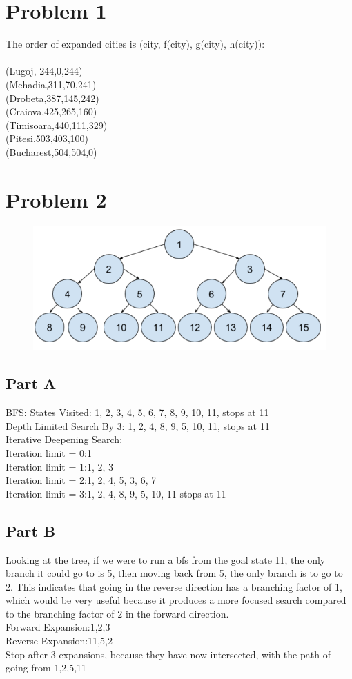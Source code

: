 \documentclass[12pt]{article}
\begin{document}
	\section*{Problem 1}
		The order of expanded cities is (city, f(city), g(city), h(city)): \\ \\
		(Lugoj, 244,0,244) \\ 
		(Mehadia,311,70,241) \\
		(Drobeta,387,145,242) \\
		(Craiova,425,265,160) \\
		(Timisoara,440,111,329) \\
		(Pitesi,503,403,100) \\
		(Bucharest,504,504,0)
		
	\section*{Problem 2}
		\begin{figure}[!htb]
			\centering
			\includegraphics[width=.5\textwidth]{Question2.png}
		\end{figure}
		\subsection*{Part A}
			BFS: States Visited: 1, 2, 3, 4, 5, 6, 7, 8, 9, 10, 11, stops at 11 \\
			Depth Limited Search By 3: 1, 2, 4, 8, 9, 5, 10, 11, stops at 11 \\
			Iterative Deepening Search: \\
			Iteration limit = 0:1 \\
			Iteration limit = 1:1, 2, 3 \\
			Iteration limit = 2:1, 2, 4, 5, 3, 6, 7 \\
			Iteration limit = 3:1, 2, 4, 8, 9, 5, 10, 11 stops at 11
		\subsection*{Part B}
			Looking at the tree, if we were to run a bfs from the goal state 11, the only branch it could go to is 5, then moving back from 5, the only branch is to go to 2. This indicates that going in the reverse direction has a branching factor of 1, which would be very useful because it produces a more focused search compared to the branching factor of 2 in the forward direction. \\
			Forward Expansion:1,2,3 \\
			Reverse Expansion:11,5,2 \\
			Stop after 3 expansions, because they have now intersected, with the path of going from 1,2,5,11
		
\end{document}
